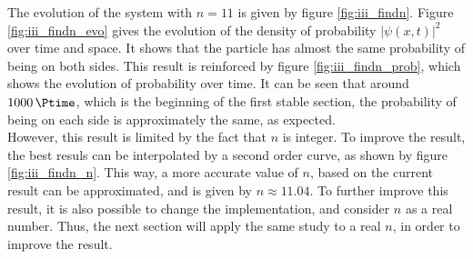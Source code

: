 \documentclass[a4paper,12pt,twoside]{article}
\newcommand{\abs}[1]{\left|#1\right|}
\begin{document}
      The evolution of the system with $n=11$ is given by figure \ref{fig:iii_findn}.
      Figure \ref{fig:iii_findn_evo} gives the evolution of the density of probability $\abs{\psi(x,t)}^2$ over time and space.
      It shows that the particle has almost the same probability of being on both sides.
      This result is reinforced by figure \ref{fig:iii_findn_prob}, which shows the evolution of probability over time.
      It can be seen that around $\SI{1000}{\Ptime}$, which is the beginning of the first stable section, the probability of being on each side is approximately the same, as expected.\\

      However, this result is limited by the fact that $n$ is integer.
      To improve the result, the best resuls can be interpolated by a second order curve, as shown by figure \ref{fig:iii_findn_n}.
      This way, a more accurate value of $n$, based on the current result can be approximated, and is given by $n\approx\num{11.04}$.
      To further improve this result, it is also possible to change the implementation, and consider $n$ as a real number.
      Thus, the next section will apply the same study to a real $n$, in order to improve the result.\\
\end{document}
